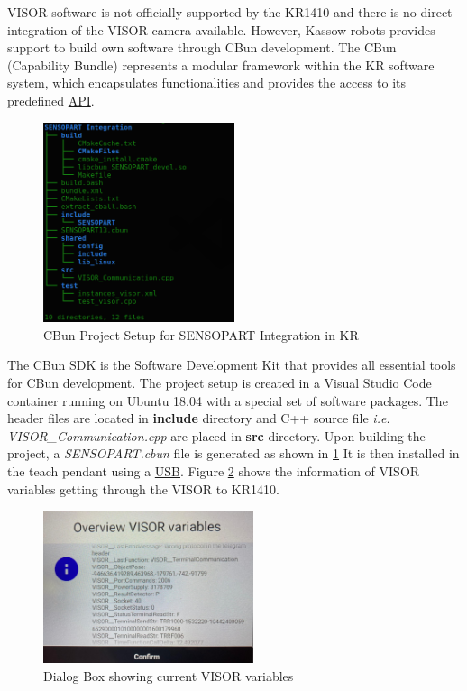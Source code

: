 VISOR software is not officially supported by the KR1410 and there is no direct integration of the VISOR camera available.
However, Kassow robots provides support to build own software through CBun development.
The CBun (Capability Bundle) represents a modular framework within the KR software system,
which encapsulates functionalities and provides the
access to its predefined \hyperref[acro:API]{API}.


\begin{figure}[h]
    \centering
    \includegraphics[width=0.5\textwidth]{figures/sensopart-development.png}
    \caption{CBun Project Setup for SENSOPART Integration in KR}
    \label{fig:sensopart-development}
\end{figure}


The CBun SDK is the Software Development Kit that provides all essential tools
for CBun development. The project setup is created in a Visual Studio Code container
running on Ubuntu 18.04 with a special set of software packages. \cite{Cbun}
The header files are located in \textbf{include} directory and C++ source file \textit{i.e.}     \textit{VISOR\_Communication.cpp}
are placed in \textbf{src} directory.
Upon building the project, a \textit{SENSOPART.cbun} file is generated as shown in \ref{fig:sensopart-development}
It is then installed in the teach pendant using a \hyperref[acro:USB]{USB}. Figure \ref{fig:cbun-variables}
shows the information of VISOR variables getting through the VISOR to KR1410.

\begin{figure}[h]
    \centering
    \includegraphics[width=0.55\textwidth]{figures/visor-cbun-connection.png}
    \caption{Dialog Box showing current VISOR variables}
    \label{fig:cbun-variables}
\end{figure}

